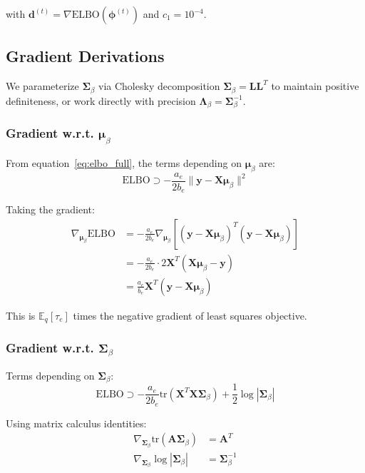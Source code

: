 \documentclass[11pt]{article}
\newcommand{\E}{\mathbb{E}}
\newcommand{\ELBO}{\text{ELBO}}
\newcommand{\tr}{\text{tr}}
\begin{document}
with $\bm{d}^{(t)} = \nabla \ELBO(\bm{\phi}^{(t)})$ and $c_1 = 10^{-4}$.

\subsection{Gradient Derivations}

We parameterize $\bm{\Sigma}_\beta$ via Cholesky decomposition $\bm{\Sigma}_\beta = \bm{L}\bm{L}^T$ to maintain positive definiteness, or work directly with precision $\bm{\Lambda}_\beta = \bm{\Sigma}_\beta^{-1}$.

\subsubsection{Gradient w.r.t. \texorpdfstring{$\bm{\mu}_\beta$}{mu_beta}}

From equation~\eqref{eq:elbo_full}, the terms depending on $\bm{\mu}_\beta$ are:
\begin{equation}
\ELBO \supset -\frac{a_e}{2b_e} \|\bm{y} - \bm{X}\bm{\mu}_\beta\|^2
\end{equation}

Taking the gradient:
\begin{align}
\nabla_{\bm{\mu}_\beta} \ELBO &= -\frac{a_e}{2b_e} \nabla_{\bm{\mu}_\beta} [(\bm{y} - \bm{X}\bm{\mu}_\beta)^T(\bm{y} - \bm{X}\bm{\mu}_\beta)] \nonumber\\
&= -\frac{a_e}{2b_e} \cdot 2\bm{X}^T(\bm{X}\bm{\mu}_\beta - \bm{y}) \nonumber\\
&= \frac{a_e}{b_e} \bm{X}^T(\bm{y} - \bm{X}\bm{\mu}_\beta)
\label{eq:grad_mu}
\end{align}

This is $\E_q[\tau_e]$ times the negative gradient of least squares objective.

\subsubsection{Gradient w.r.t. \texorpdfstring{$\bm{\Sigma}_\beta$}{Sigma_beta}}

Terms depending on $\bm{\Sigma}_\beta$:
\begin{equation}
\ELBO \supset -\frac{a_e}{2b_e} \tr(\bm{X}^T\bm{X}\bm{\Sigma}_\beta) + \frac{1}{2}\log |\bm{\Sigma}_\beta|
\end{equation}

Using matrix calculus identities:
\begin{align}
\nabla_{\bm{\Sigma}_\beta} \tr(\bm{A}\bm{\Sigma}_\beta) &= \bm{A}^T\\
\nabla_{\bm{\Sigma}_\beta} \log |\bm{\Sigma}_\beta| &= \bm{\Sigma}_\beta^{-1}
\end{align}
\end{document}
